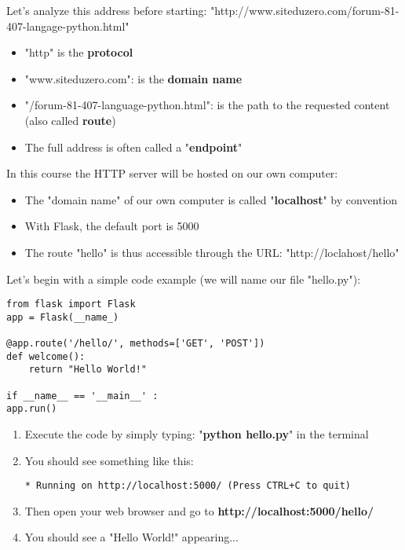 \documentclass{beamer}[10pt, usepdftitle=false handout]
\begin{document}
\begin{frame}
Let's analyze this address before starting: "http://www.siteduzero.com/forum-81-407-langage-python.html"
\vspace*{0.6em}

\begin{itemize}
\item{"http" is the \textbf{protocol}}
\item{"www.siteduzero.com": is the \textbf{domain name}}
\item{"/forum-81-407-language-python.html": is the path to the requested content (also called \textbf{route})}
\item{The full address is often called a "\textbf{endpoint}"}
\end{itemize}
\vspace*{0.6em}

In this course the HTTP server will be hosted on our own computer:
\vspace*{0.6em}

\begin{itemize}
\item{The "domain name" of our own computer is called "\textbf{localhost}" by convention}
\item{With Flask, the default port is 5000}
\item{The route "hello" is thus accessible through the URL: "http://loclahost/hello"}
\end{itemize}

\end{frame}
\begin{frame}[fragile]

Let's begin with a simple code example (we will name our file "hello.py"):
\vspace*{0.6em}

\begin{verbatim}
from flask import Flask
app = Flask(__name_)

@app.route('/hello/', methods=['GET', 'POST'])
def welcome():
    return "Hello World!"

if __name__ == '__main__' :
app.run()
\end{verbatim}

\begin{enumerate}
\item{Execute the code by simply typing: "\textbf{python hello.py}" in the terminal}
\item{You should see something like this:
\begin{verbatim}
* Running on http://localhost:5000/ (Press CTRL+C to quit)
\end{verbatim}}
\item{Then open your web browser and go to \textbf{http://localhost:5000/hello/}}
\item{You should see a "Hello World!" appearing...}
\end{enumerate}
	

\end{frame}
\end{document}
